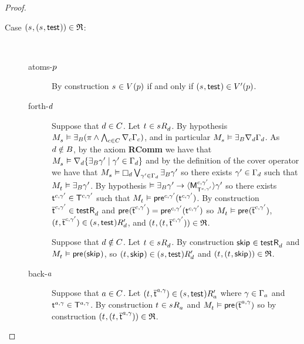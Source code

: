 \begin{proof}
\begin{description}
    \item[{Case $(\kStateS, (\kStateS, \aStateTest)) \in \refinement$:}] \hfill \\
        \begin{description}
            \item[atoms-$\atomP$]
                By construction $\kStateS \in \kValuation(\atomP)$ if and only if $(\kStateS, \aStateTest) \in \kValuationP(\atomP)$.
            \item[forth-$\agentD$]
                Suppose that $\agentD \in \agentsC$.
                Let $\kStateT \in \kSuccessorsD{\kStateS}$.
                By hypothesis $\kPModel{\kStateS} \entails \someactsBs (\pi \land \bigwedge_{\agentC \in \agentsC} \coversC \Gamma_\agentC)$, and in particular $\kPModel{\kStateS} \entails \someactsBs \coversD \Gamma_\agentD$.
                As $\agentD \notin \agentsB$, by the \axiomAamlKFF{} axiom {\bf RComm} we have that $\kPModel{\kStateS} \entails \coversD \{\someactsBs \gamma' \mid \gamma' \in \Gamma_\agentD\}$ and by the definition of the cover operator we have that $\kPModel{\kStateS} \entails \necessaryD \bigvee_{\gamma' \in \Gamma_\agentD} \someactsBs \gamma'$ so there exists $\gamma' \in \Gamma_\agentD$ such that $\kPModel{\kStateT} \entails \someactsBs \gamma'$.
                By hypothesis $\entails \someactsBs \gamma' \implies \actionE{\aPModel[\agentC, \gamma']{\aStatesT[\agentC, \gamma']}} \gamma'$ so there exists $\aStateT[\agentC, \gamma'] \in \aStatesT[\agentC, \gamma']$ such that $\kPModel{\kStateT} \entails \aPrecondition[\agentC, \gamma'](\aStateT[\agentC, \gamma'])$.
                By construction $\aPStateT[\agentC, \gamma'] \in \aSuccessorsD{\aStateTest}$ and $\aPrecondition(\aPStateT[\agentC, \gamma']) = \aPrecondition[\agentC, \gamma'](\aStateT[\agentC, \gamma'])$ so $\kPModel{\kStateT} \entails \aPrecondition(\aPStateT[\agentC, \gamma'])$, $(\kStateT, \aPStateT[\agentC, \gamma']) \in \kSuccessorsPD{(\kStateS, \aStateTest)}$, and $(\kStateT, (\kStateT, \aPStateT[\agentC, \gamma'])) \in \refinement$.

                Suppose that $\agentD \notin \agentsC$.
                Let $\kStateT \in \kSuccessorsD{\kStateS}$.
                By construction $\aStateSkip \in \aSuccessorsD{\aStateTest}$ and $\kPModel{\kStateT} \entails \aPrecondition(\aStateSkip)$, so $(\kStateT, \aStateSkip) \in \kSuccessorsPD{(\kStateS, \aStateTest)}$ and $(\kStateT, (\kStateT, \aStateSkip)) \in \refinement$.
            \item[back-$\agentA$]
                Suppose that $\agentA \in \agentsC$.
                Let $(\kStateT, \aPStateT[\agentA, \gamma]) \in \kSuccessorsPA{(\kStateS, \aStateTest)}$ where $\gamma \in \Gamma_\agentA$ and $\aStateT[\agentA, \gamma] \in \aStatesT[\agentA, \gamma]$.
                By construction $\kStateT \in \kSuccessorsA{\kStateS}$ and $\kPModel{\kStateT} \entails \aPrecondition(\aPStateT[\agentA, \gamma])$ so by construction $(\kStateT, (\kStateT, \aPStateT[\agentA, \gamma])) \in \refinement$.


\end{description}
\end{description}
\end{proof}
